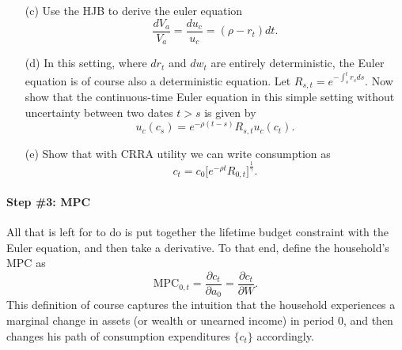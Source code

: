\documentclass[11pt]{extarticle}
\theoremstyle{plain}
\theoremstyle{definition}
\begin{document}
\begin{enumerate}
\item [(c)] Use the HJB to derive the euler equation
\begin{equation*}
	\frac{dV_a}{V_a} = \frac{du_c}{u_c} =  (\rho - r_t) dt. 
\end{equation*}

\item [(d)] In this setting, where $dr_t$ and $dw_t$ are entirely deterministic, the Euler equation is of course also a deterministic equation. Let $R_{s,t}=e^{-\int_s^t r_s ds}$. Now show that the continuous-time Euler equation in this simple setting without uncertainty between two dates $t > s$ is given by
\begin{equation*}
	u_c(c_s) = e^{- \rho (t-s)} R_{s,t} u_c(c_t). 
\end{equation*}

\item [(e)] Show that with CRRA utility we can write consumption as 
\begin{equation*}
	c_t = c_0 \bigg[ e^{- \rho t} R_{0,t} \bigg]^\frac{1}{\gamma} .
\end{equation*}

\end{enumerate}


\vspace{5mm}
\paragraph{Step \#3: MPC}
All that is left for to do is put together the lifetime budget constraint with the Euler equation, and then take a derivative. To that end, define the household's MPC as 
\begin{equation*}
	\text{MPC}_{0,t} = \frac{\partial c_t}{\partial a_0} = \frac{\partial c_t}{\partial W}.
\end{equation*}
This definition of course captures the intuition that the household experiences a marginal change in assets (or wealth or unearned income) in period $0$, and then changes his path of consumption expenditures $\{ c_t\}$ accordingly. 
\end{document}

